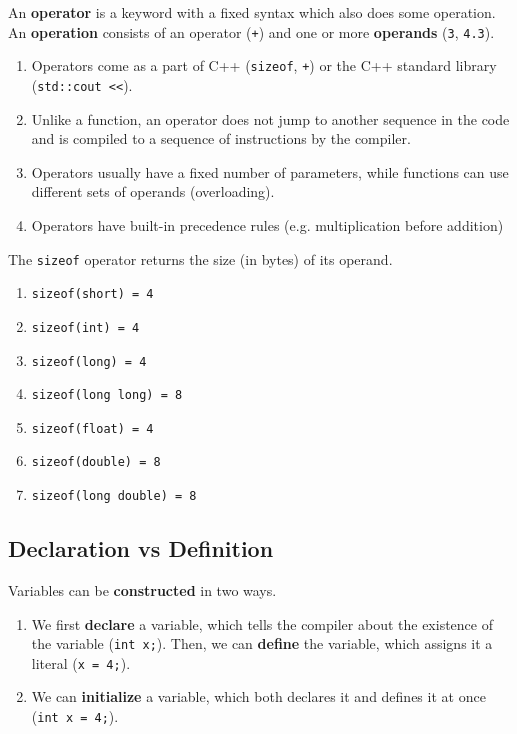 \documentclass{article}
\begin{document}
    \begin{definition}[Operations]
      An \textbf{operator} is a keyword with a fixed syntax which also does some operation. An \textbf{operation} consists of an operator (\texttt{+}) and one or more \textbf{operands} (\texttt{3}, \texttt{4.3}).  
      \begin{enumerate}
        \item Operators come as a part of C++ (\texttt{sizeof}, \texttt{+}) or the C++ standard library (\texttt{std::cout <<}). 
        \item Unlike a function, an operator does not jump to another sequence in the code and is compiled to a sequence of instructions by the compiler. 
        \item Operators usually have a fixed number of parameters, while functions can use different sets of operands (overloading). 
        \item Operators have built-in precedence rules (e.g. multiplication before addition) 
      \end{enumerate}
    \end{definition}

    \begin{definition}
      The \texttt{sizeof} operator returns the size (in bytes) of its operand. 
      \begin{enumerate}
        \item \texttt{sizeof(short) = 4}
        \item \texttt{sizeof(int) = 4}
        \item \texttt{sizeof(long) = 4}
        \item \texttt{sizeof(long long) = 8}
        \item \texttt{sizeof(float) = 4}
        \item \texttt{sizeof(double) = 8}
        \item \texttt{sizeof(long double) = 8}
      \end{enumerate} 
    \end{definition}

  \subsection{Declaration vs Definition} 

    Variables can be \textbf{constructed} in two ways. 
    \begin{enumerate}
      \item We first \textbf{declare} a variable, which tells the compiler about the existence of the variable (\texttt{int x;}). Then, we can \textbf{define} the variable, which assigns it a literal (\texttt{x = 4;}). 
      \item We can \textbf{initialize} a variable, which both declares it and defines it at once (\texttt{int x = 4;}).
    \end{enumerate}
\end{document}
